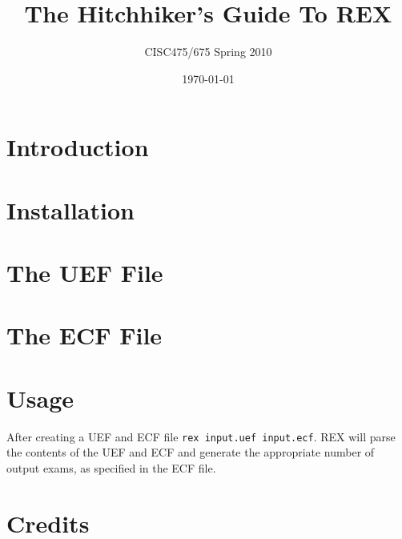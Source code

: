 \documentclass{article}
\author{CISC475/675 Spring 2010}
\title{The Hitchhiker's Guide To REX}
\date{\today}
\begin{document}
\maketitle
\tableofcontents
\newpage

\section{Introduction}

\section{Installation}

\section{The UEF File}

\section{The ECF File}

\section{Usage}
After creating a UEF and ECF file \texttt{rex input.uef input.ecf}. 
REX will parse the contents of the UEF and ECF and generate the appropriate number of
output exams, as specified in the ECF file.

\section{Credits}
\end{document}
